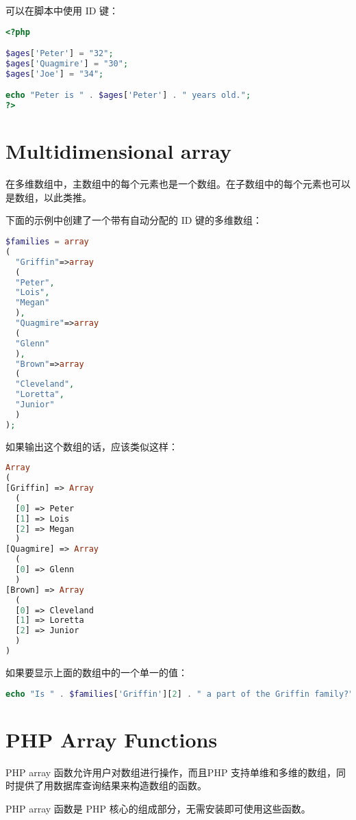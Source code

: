 可以在脚本中使用 ID 键：

\begin{lstlisting}[language=PHP]
<?php

$ages['Peter'] = "32";
$ages['Quagmire'] = "30";
$ages['Joe'] = "34";

echo "Peter is " . $ages['Peter'] . " years old.";
?>
\end{lstlisting}

\section{Multidimensional array}



在多维数组中，主数组中的每个元素也是一个数组。在子数组中的每个元素也可以是数组，以此类推。


下面的示例中创建了一个带有自动分配的 ID 键的多维数组：


\begin{lstlisting}[language=PHP]
$families = array
(
  "Griffin"=>array
  (
  "Peter",
  "Lois",
  "Megan"
  ),
  "Quagmire"=>array
  (
  "Glenn"
  ),
  "Brown"=>array
  (
  "Cleveland",
  "Loretta",
  "Junior"
  )
);
\end{lstlisting}

如果输出这个数组的话，应该类似这样：


\begin{lstlisting}[language=PHP]
Array
(
[Griffin] => Array
  (
  [0] => Peter
  [1] => Lois
  [2] => Megan
  )
[Quagmire] => Array
  (
  [0] => Glenn
  )
[Brown] => Array
  (
  [0] => Cleveland
  [1] => Loretta
  [2] => Junior
  )
)
\end{lstlisting}

如果要显示上面的数组中的一个单一的值：


\begin{lstlisting}[language=PHP]
echo "Is " . $families['Griffin'][2] . " a part of the Griffin family?"; 
\end{lstlisting}





\section{PHP Array Functions}


PHP array 函数允许用户对数组进行操作，而且PHP 支持单维和多维的数组，同时提供了用数据库查询结果来构造数组的函数。

PHP array 函数是 PHP 核心的组成部分，无需安装即可使用这些函数。



